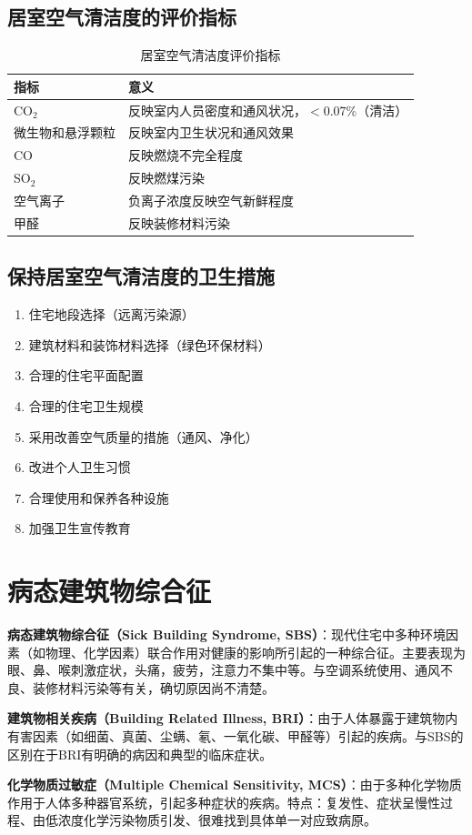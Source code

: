 \subsection{居室空气清洁度的评价指标}

\begin{table}[htbp]
\centering
\caption{居室空气清洁度评价指标}
\begin{tabularx}{\textwidth}{lX}
\hline
\textbf{指标} & \textbf{意义} \\
\hline
CO$_2$ & 反映室内人员密度和通风状况，$<$0.07\%（清洁） \\
微生物和悬浮颗粒 & 反映室内卫生状况和通风效果 \\
CO & 反映燃烧不完全程度 \\
SO$_2$ & 反映燃煤污染 \\
空气离子 & 负离子浓度反映空气新鲜程度 \\
甲醛 & 反映装修材料污染 \\
\hline
\end{tabularx}
\end{table}

\subsection{保持居室空气清洁度的卫生措施}

\begin{enumerate}[leftmargin=*]
    \item 住宅地段选择（远离污染源）
    \item 建筑材料和装饰材料选择（绿色环保材料）
    \item 合理的住宅平面配置
    \item 合理的住宅卫生规模
    \item 采用改善空气质量的措施（通风、净化）
    \item 改进个人卫生习惯
    \item 合理使用和保养各种设施
    \item 加强卫生宣传教育
\end{enumerate}

\section{病态建筑物综合征}

\begin{defbox}
\textbf{病态建筑物综合征（Sick Building Syndrome, SBS）}：现代住宅中多种环境因素（如物理、化学因素）联合作用对健康的影响所引起的一种综合征。主要表现为眼、鼻、喉刺激症状，头痛，疲劳，注意力不集中等。与空调系统使用、通风不良、装修材料污染等有关，确切原因尚不清楚。

\textbf{建筑物相关疾病（Building Related Illness, BRI）}：由于人体暴露于建筑物内有害因素（如细菌、真菌、尘螨、氡、一氧化碳、甲醛等）引起的疾病。与SBS的区别在于BRI有明确的病因和典型的临床症状。

\textbf{化学物质过敏症（Multiple Chemical Sensitivity, MCS）}：由于多种化学物质作用于人体多种器官系统，引起多种症状的疾病。特点：复发性、症状呈慢性过程、由低浓度化学污染物质引发、很难找到具体单一对应致病原。
\end{defbox}

